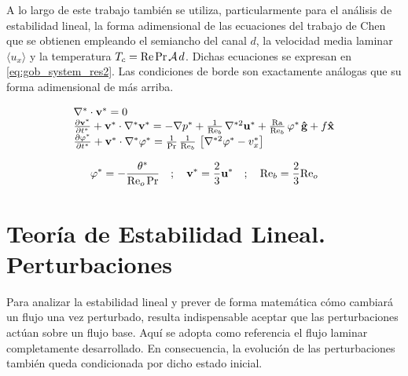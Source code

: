 A lo largo de este trabajo también se utiliza, particularmente para el análisis de estabilidad lineal, la forma adimensional de las ecuaciones del trabajo de Chen \cite{chen1996linear} que se obtienen empleando el  semiancho del canal $d$, la velocidad media laminar $\langle u_x \rangle$ y la temperatura $T_c = \text{Re} \hspace{0.5mm} \text{Pr} \hspace{0.5mm} \mathcal{A} \hspace{0.5mm} d$. Dichas ecuaciones se expresan en \ref{eq:gob_system_res2}. Las condiciones de borde son exactamente análogas que su forma adimensional de más arriba.

\begin{equation}
\begin{array}{l}
    \nabla^* \cdot \mathbf{v^*} = 0 \\
    \frac{\partial \mathbf{v^*}}{\partial t^*} + \mathbf{v^*} \cdot \nabla^* \mathbf{v^*} = 
    -\nabla p^* + \frac{1}{\text{Re}_b} \hspace{0.5mm} \nabla^{*2} \mathbf{u^*} + \frac{\text{Ra}}{\text{Re}_b} \hspace{0.5mm} \varphi^* \hspace{0.5mm} \mathbf{\hat{g}} + f \mathbf{\hat{x}} \\
    \frac{\partial \varphi^*}{\partial t^*} + \mathbf{v^*} \cdot \nabla^* \varphi^* = 
    \frac{1}{\text{Pr}}\hspace{0.5mm}  \frac{1}{\text{Re}_b} \hspace{0.5mm} \left[ \nabla^{*2} \varphi^* - v_x^* \right]  
\end{array}
\label{eq:gob_system_res2}
\end{equation}

\begin{equation*}
\varphi^* = -  \frac{\theta^*}{\text{Re}_o \hspace{0.5mm} \text{Pr}}  \quad ; \quad \mathbf{v^*} = \frac{2}{3} \mathbf{u^*} \quad ; \quad \text{Re}_b = \frac{2}{3} \text{Re}_o
\end{equation*}  

\newpage
\section{Teoría de Estabilidad Lineal. Perturbaciones} \label{line_an}

Para analizar la estabilidad lineal y prever de forma matemática cómo cambiará un flujo una vez perturbado, resulta indispensable aceptar que las perturbaciones actúan sobre un flujo base. Aquí se adopta como referencia el flujo laminar completamente desarrollado. En consecuencia, la evolución de las perturbaciones también queda condicionada por dicho estado inicial.



